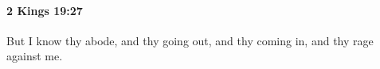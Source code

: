 
		\paragraph{2 Kings 19:27} %
			\label{2KINGS-19-27}

			But I know thy abode, and thy going out, and thy coming in, and thy rage against me.


